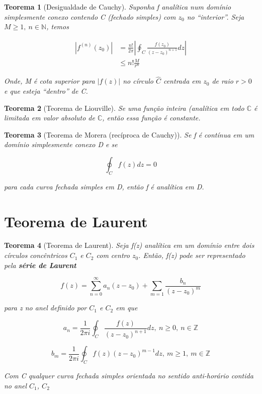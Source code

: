 \documentclass{article}
\newtheorem{theorem}{Teorema}
\begin{document}
\begin{theorem}[Desigualdade de Cauchy]
Suponha f analítica num domínio simplesmente conexo contendo C (fechado simples) com $z_0$ no ``interior''. Seja $M \geq 1,\ n \in \mathbb{N}$, temos

\begin{align*}
    \left| f^{(n)}(z_0) \right| &= \frac{n!}{2 \pi} \left| \oint_C \frac{f(z_0)}{(z - z_0)^{n+1}} d z \right| \\
    &\leq n! \frac{M}{r^n}
\end{align*}

Onde, M é cota superior para $|f(z)|$ no círculo $\hat{C}$ centrada em $z_0$ de raio $r > 0$ e que esteja ``dentro'' de C.
\end{theorem}

\begin{theorem}[Teorema de Liouville]
Se uma função inteira (analítica em todo $\mathbb{C}$ é limitada em valor absoluto de $\mathbb{C}$, então essa função é constante.
\end{theorem}

\begin{theorem}[Teorema de Morera (recíproca de Cauchy)]
Se f é contínua em um domínio simplesmente conexo D e se

$$\oint_C f(z) d z = 0$$

para cada curva fechada simples em D, então f é analítica em D.
\end{theorem}

\section*{Teorema de Laurent}
\label{s8}

\begin{theorem}[Teorema de Laurent]
Seja f(z) analítica em um domínio entre dois círculos concêntricos $C_1$ e $C_2$ com centro $z_0$. Então, f(z) pode ser representado pela \textbf{série de Laurent}

$$f(z) = \sum_{n = 0}^\infty a_n (z - z_0) + \sum_{m = 1} \frac{b_n}{(z - z_0)^m}$$

para z no anel definido por $C_1$ e $C_2$ em que

$$a_n = \frac{1}{2 \pi i} \oint_C \frac{f(z)}{(z - z_0)^{n + 1}} d z,\ n \geq 0,\ n \in \mathbb{Z}$$

$$b_m = \frac{1}{2 \pi i} \oint_C f(z) (z - z_0)^{m - 1} d z,\ m \geq 1,\ m \in \mathbb{Z}$$

Com C qualquer curva fechada simples orientada no sentido anti-horário contida no anel $C_1$, $C_2$
\end{theorem}
\end{document}
